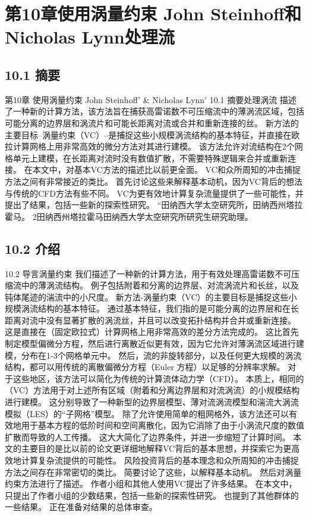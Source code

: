 \documentclass[UTF8,11pt,a4paper,openany,fontset=fandol]{ctexbook}
\begin{document}
\clearpage
\chapter{第10章使用涡量约束 John Steinhoff和Nicholas Lynn处理流}
\section{10.1 摘要}
第10章 使用涡量约束 John Steinhoff' \& Nicholas Lynn' 10.1 摘要处理涡流 描述了一种新的计算方法，该方法旨在捕获高雷诺数不可压缩流中的薄涡流区域，包括可能分离的边界层和涡流片和可能长距离对流或合并和重新连接的丝。 新方法的主要目标--涡量约束（VC）--是捕捉这些小规模涡流结构的基本特征，并直接在欧拉计算网格上用非常高效的微分方法对其进行建模。 该方法允许对流结构在2个网格单元上建模，在长距离对流时没有数值扩散，不需要特殊逻辑来合并或重新连接。 在本文中，对基本VC方法的描述比以前更全面。 VC和众所周知的冲击捕捉方法之间有非常接近的类比。 首先讨论这些来解释基本动机，因为VC背后的想法与传统的CFD方法有些不同。 VC为更有效地计算复杂流量提供了一些可能性，并提出了结果，包括一些新的探索性研究。 “田纳西大学太空研究所，田纳西州塔拉霍马。 2田纳西州塔拉霍马田纳西大学太空研究所研究生研究助理。

\section{10.2 介绍}
10.2 导言涡量约束 我们描述了一种新的计算方法，用于有效处理高雷诺数不可压缩流中的薄涡流结构。 例子包括附着和分离的边界层、对流涡流片和长丝，以及钝体尾迹的湍流中的小尺度。 新方法-涡量约束（VC）的主要目标是捕捉这些小规模涡流结构的基本特征。 通过基本特征，我们指的是可能分离的边界层和在长距离对流中没有显著扩散的涡流丝，并且可以改变拓扑结构并合并或重新连接。 这是直接在（固定欧拉式）计算网格上用非常高效的差分方法完成的。 这比首先制定模型偏微分方程，然后进行离散近似更有效，因为它允许对薄涡流区域进行建模，分布在1-3个网格单元中。 然后，流的非旋转部分，以及任何更大规模的涡流结构，都可以用传统的离散偏微分方程（Euler 方程）以足够的分辨率求解。 对于这些地区，该方法可以简化为传统的计算流体动力学（CFD）。 本质上，相同的（VC）方法用于对上述所有区域（附着和分离边界层和对流涡流）的小规模结构进行建模。 这分别导致了一种新型的边界层模型、薄对流涡流模型和湍流大涡流模拟（LES）的“子网格”模型。 除了允许使用简单的粗网格外，该方法还可以有效地用于基本方程的低阶时间和空间离散化，因为它消除了由于小涡流尺度的数值扩散而导致的人工传播。 这大大简化了边界条件，并进一步缩短了计算时间。 本文的主要目的是比以前的论文更详细地解释VC背后的基本思想，并探索它为更高效地计算复杂流提供的可能性。 风险投资背后的基本理念和众所周知的冲击捕捉方法之间存在非常密切的类比。 简要讨论了这些，以解释基本动机。 然后对涡量约束方法进行了描述。 作者小组和其他人使用VC提出了许多结果。 在本文中，只提出了作者小组的少数结果，包括一些新的探索性研究。 也提到了其他群体的一些结果。 正在准备对结果的总体审查。
\end{document}
